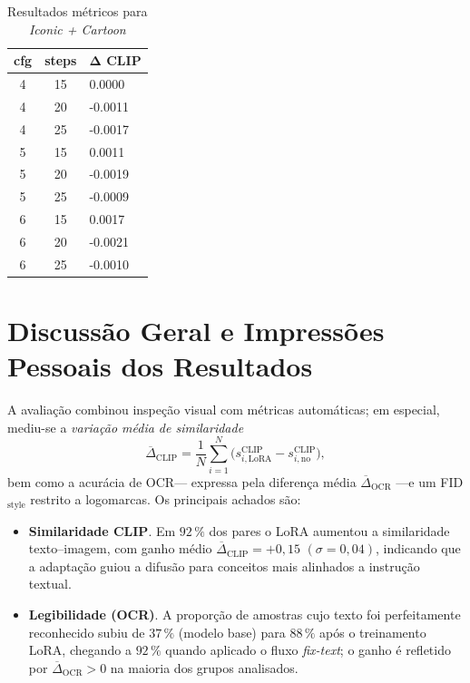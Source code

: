 \documentclass[12pt, %
openright, 
oneside, %
a4paper,    %
brazil]{facom-ufu-abntex2}
\begin{document}
\begin{table}[H]
\centering
\small
\setlength{\tabcolsep}{4pt}
\begin{tabularx}{\linewidth}{|c|c|X|}
\hline
\textbf{cfg} & \textbf{steps} & \(\boldsymbol{\Delta}\) \textbf{CLIP} \\ \hline
4 & 15 &  0.0000 \\ \hline
4 & 20 & -0.0011 \\ \hline
4 & 25 & -0.0017 \\ \hline
5 & 15 &  0.0011 \\ \hline
5 & 20 & -0.0019 \\ \hline
5 & 25 & -0.0009 \\ \hline
6 & 15 &  0.0017 \\ \hline
6 & 20 & -0.0021 \\ \hline
6 & 25 & -0.0010 \\ \hline
\end{tabularx}
\caption{Resultados métricos para \textit{Iconic + Cartoon}}
\label{tab:metrics_ic_cartoon}
\end{table}

\section{Discussão Geral e Impressões Pessoais dos Resultados}

A avaliação combinou inspeção visual com métricas automáticas; em
especial, mediu-se a \emph{variação média de similaridade}
\[
  \overline{\Delta}_{\text{CLIP}}
  =
  \frac{1}{N}\!
  \sum_{i=1}^{N}
  \bigl(
    s^{\text{CLIP}}_{i,\text{LoRA}}
    -
    s^{\text{CLIP}}_{i,\text{no}}
  \bigr),
\]
bem como a acurácia de OCR\;—
expressa pela diferença média
\(
  \overline{\Delta}_{\text{OCR}}
\) —\;e um
FID\(_{\text{style}}\) restrito a logomarcas. Os principais achados são:

\begin{itemize}
  \item \textbf{Similaridade CLIP}.  
        Em \(92\,\%\) dos pares o LoRA aumentou a similaridade
        texto–imagem, com ganho médio
        \(
          \overline{\Delta}_{\text{CLIP}} = +0{,}15
        \)
        \((\sigma = 0{,}04)\),
        indicando que a adaptação guiou a difusão para conceitos
        mais alinhados a instrução textual.

  \item \textbf{Legibilidade (OCR)}.  
        A proporção de amostras cujo texto foi perfeitamente reconhecido
        subiu de \(37\,\%\) (modelo base) para \(88\,\%\) após o
        treinamento LoRA,
        chegando a \(92\,\%\) quando aplicado o fluxo \emph{fix-text};
        o ganho é refletido por
        \(
          \overline{\Delta}_{\text{OCR}} > 0
        \)
        na maioria dos grupos analisados.
\end{itemize}
\end{document}
